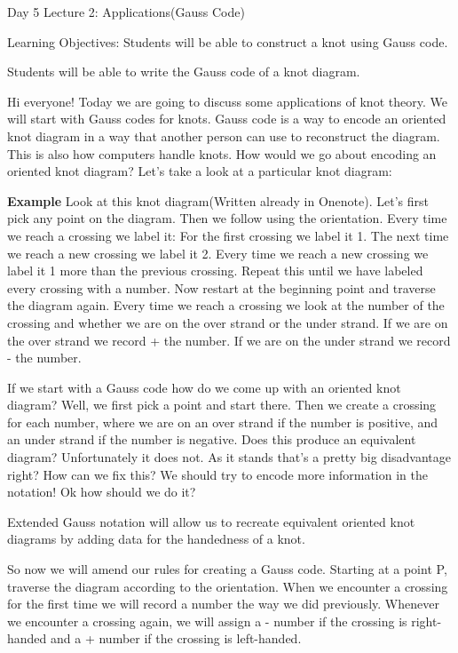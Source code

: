 \documentclass{article}
\begin{document}
\begin{section}{Day 5 Lecture 2: Applications(Gauss Code)}

Learning Objectives: Students will be able to construct a knot using Gauss code.\medbreak

Students will be able to write the Gauss code of a knot diagram.\medbreak

Hi everyone! Today we are going to discuss some applications of knot theory. We will start with Gauss codes for knots. Gauss code is a way to encode an oriented knot diagram in a way that another person can use to reconstruct the diagram. This is also how computers handle knots. How would we go about encoding an oriented knot diagram? Let's take a look at a particular knot diagram:

\textbf{Example} Look at this knot diagram(Written already in Onenote). Let's first pick any point on the diagram. Then we follow using the orientation. Every time we reach a crossing we label it: For the first crossing we label it 1. The next time we reach a new crossing we label it 2. Every time we reach a new crossing we label it 1 more than the previous crossing. Repeat this until we have labeled every crossing with a number. Now restart at the beginning point and traverse the diagram again. Every time we reach a crossing we look at the number of the crossing and whether we are on the over strand or the under strand. If we are on the over strand we record + the number. If we are on the under strand we record - the number.\medbreak

If we start with a Gauss code how do we come up with an oriented knot diagram? Well, we first pick a point and start there. Then we create a crossing for each number, where we are on an over strand if the number is positive, and an under strand if the number is negative. Does this produce an equivalent diagram? Unfortunately it does not. As it stands that's a pretty big disadvantage right? How can we fix this? We should try to encode more information in the notation! Ok how should we do it?\medbreak

Extended Gauss notation will allow us to recreate equivalent oriented knot diagrams by adding data for the handedness of a knot.  \medbreak

So now we will amend our rules for creating a Gauss code. Starting at a point P, traverse the diagram according to the orientation. When we encounter a crossing for the first time we will record a number the way we did previously. Whenever we encounter a crossing again, we will assign a - number if the crossing is right-handed and a + number if the crossing is left-handed.


\end{section}
\end{document}
